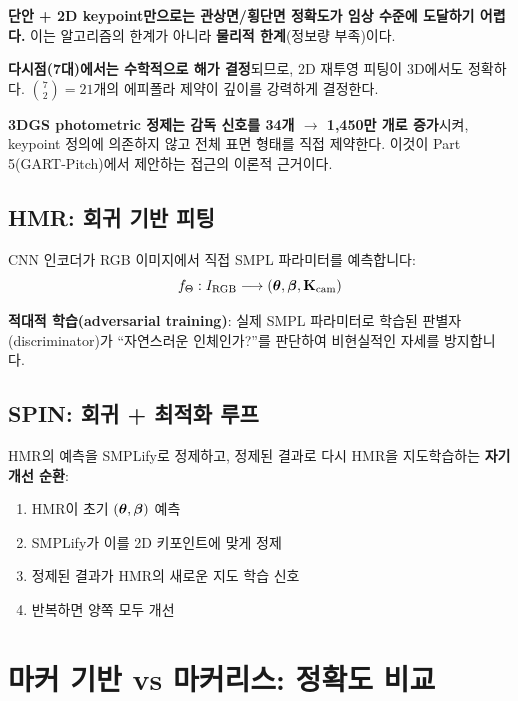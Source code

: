 \documentclass[11pt, a4paper]{report}
\begin{document}
\begin{importantnote}[title={핵심 결론: 2D 재투영 피팅은 언제 ``제대로'' 되는가}]

\textbf{단안 + 2D keypoint만으로는 관상면/횡단면 정확도가 임상 수준에 도달하기 어렵다.}
이는 알고리즘의 한계가 아니라 \textbf{물리적 한계}(정보량 부족)이다.

\textbf{다시점(7대)에서는 수학적으로 해가 결정}되므로, 2D 재투영 피팅이 3D에서도 정확하다.
$\binom{7}{2} = 21$개의 에피폴라 제약이 깊이를 강력하게 결정한다.

\textbf{3DGS photometric 정제는 감독 신호를 34개 $\rightarrow$ 1,450만 개로 증가}시켜,
keypoint 정의에 의존하지 않고 전체 표면 형태를 직접 제약한다.
이것이 Part 5(GART-Pitch)에서 제안하는 접근의 이론적 근거이다.
\end{importantnote}


\subsection{HMR: 회귀 기반 피팅}

CNN 인코더가 RGB 이미지에서 직접 SMPL 파라미터를 예측합니다:
\begin{equation}
f_\Theta : I_{\text{RGB}} \longrightarrow (\bm{\theta}, \bm{\beta}, \mathbf{K}_{\text{cam}})
\end{equation}

\textbf{적대적 학습(adversarial training)}: 실제 SMPL 파라미터로 학습된 판별자(discriminator)가 ``자연스러운 인체인가?''를 판단하여 비현실적인 자세를 방지합니다.

\subsection{SPIN: 회귀 + 최적화 루프}

HMR의 예측을 SMPLify로 정제하고, 정제된 결과로 다시 HMR을 지도학습하는 \textbf{자기 개선 순환}:
\begin{enumerate}[leftmargin=*]
  \item HMR이 초기 $(\bm{\theta}, \bm{\beta})$ 예측
  \item SMPLify가 이를 2D 키포인트에 맞게 정제
  \item 정제된 결과가 HMR의 새로운 지도 학습 신호
  \item 반복하면 양쪽 모두 개선
\end{enumerate}


\section{마커 기반 vs 마커리스: 정확도 비교}
\label{sec:accuracy_comparison}
\end{document}
